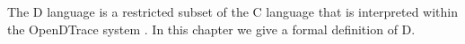 The D language is a restricted subset of the C language that is
interpreted within the OpenDTrace system \cite{Kernighan:1988}.  In
this chapter we give a formal definition of D.

